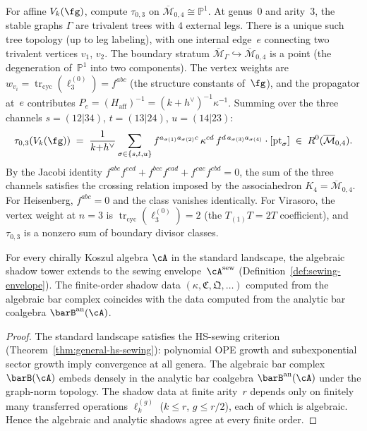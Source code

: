 \begin{example}
\label{ex:tau-03-affine}
For affine $V_k(\fg)$, compute $\tau_{0,3}$ on
$\overline{\mathcal{M}}_{0,4} \cong \mathbb{P}^1$.
At genus~$0$ and arity~$3$, the stable graphs $\Gamma$ are
trivalent trees with $4$ external legs.  There is a unique such
tree topology (up to leg labeling), with one internal edge~$e$
connecting two trivalent vertices $v_1$, $v_2$.  The boundary
stratum $\overline{\mathcal{M}}_\Gamma \hookrightarrow
\overline{\mathcal{M}}_{0,4}$ is a point
(the degeneration of~$\mathbb{P}^1$ into two components).
The vertex weights are
$w_{v_i} = \operatorname{tr}_{\mathrm{cyc}}(\ell_3^{(0)})
= f^{abc}$ (the structure constants of~$\fg$), and the
propagator at~$e$ contributes
$P_e = (H_{\mathrm{aff}})^{-1}
= (k{+}h^\vee)^{-1} \kappa^{-1}$.
Summing over the three channels
$s = (12|34)$, $t = (13|24)$, $u = (14|23)$:
\[
\tau_{0,3}(V_k(\fg))
\;=\;
\frac{1}{k{+}h^\vee}
\sum_{\sigma \in \{s,t,u\}}
f^{a_{\sigma(1)}a_{\sigma(2)}c}\,
\kappa^{cd}\,
f^{d\,a_{\sigma(3)}a_{\sigma(4)}}
\cdot [\mathrm{pt}_\sigma]
\;\in\; R^0(\overline{\mathcal{M}}_{0,4}).
\]
By the Jacobi identity
$f^{abe}f^{ecd} + f^{bce}f^{ead} + f^{cae}f^{ebd} = 0$,
the sum of the three channels satisfies the crossing relation
imposed by the associahedron
$K_4 = \overline{\mathcal{M}}_{0,4}$.  For Heisenberg,
$f^{abc} = 0$ and the class vanishes identically.  For
Virasoro, the vertex weight at $n = 3$ is
$\operatorname{tr}_{\mathrm{cyc}}(\ell_3^{(0)}) = 2$
(the $T_{(1)}T = 2T$ coefficient), and $\tau_{0,3}$
is a nonzero sum of boundary divisor classes.
\end{example}

\begin{corollary}
\label{cor:analytic-shadow-realization}
\ClaimStatusProvedHere
{}
For every chirally Koszul algebra $\cA$ in the standard
landscape, the algebraic shadow tower extends to the sewing
envelope~$\cA^{\mathrm{sew}}$
\textup{(}Definition~\textup{\ref{def:sewing-envelope}}\textup{)}.
The finite-order shadow data $(\kappa, \mathfrak{C},
\mathfrak{Q}, \ldots)$ computed from the algebraic bar complex
coincides with the data computed from the analytic bar
coalgebra $\barB^{\mathrm{an}}(\cA)$.
\end{corollary}

\begin{proof}
The standard landscape satisfies the HS-sewing criterion
(Theorem~\ref{thm:general-hs-sewing}): polynomial OPE growth
and subexponential sector growth imply convergence at all
genera.  The algebraic bar complex $\barB(\cA)$ embeds densely
in the analytic bar coalgebra $\barB^{\mathrm{an}}(\cA)$
under the graph-norm topology.  The shadow data at finite
arity~$r$ depends only on finitely many transferred operations
$\ell_k^{(g)}$ ($k \leq r$, $g \leq r/2$), each of which is
algebraic.  Hence the algebraic and analytic shadows agree at
every finite order.
\end{proof}


